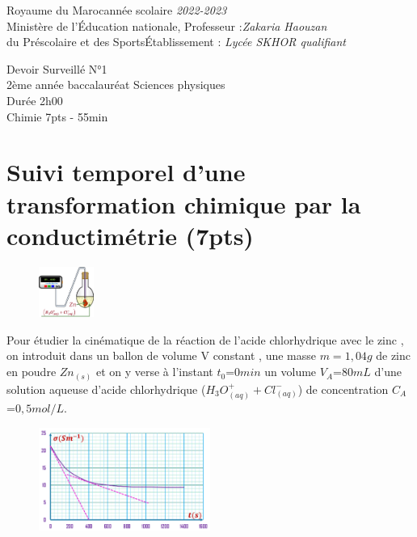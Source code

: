 \documentclass[12pt]{article}
\newcommand\headerMe[2]{\noindent{}#1\hfill#2}
\begin{document}
\headerMe{Royaume du Maroc}{année scolaire \emph{2022-2023}}\\
\headerMe{Ministère de l'Éducation nationale, }{  Professeur :\emph{Zakaria Haouzan}}\\
\headerMe{du Préscolaire et des Sports}{Établissement : \emph{Lycée SKHOR qualifiant}}\\
\vspace{-1cm}
\begin{center}
Devoir Surveillé  N°1 \\
    2ème année baccalauréat Sciences physiques\\
Durée 2h00
\\
    \vspace{.2cm}
\hrulefill
\Large{Chimie 7pts - 55min}
\hrulefill\\

\end{center}

 \section*{Suivi temporel d’une transformation chimique par la conductimétrie \dotfill(7pts) }
\begin{figure}
	\vspace{-1.2cm}
\begin{center}
  \includegraphics[width=0.16\textwidth]{./img/chimie01.png}
\end{center}
\end{figure}


Pour étudier la cinématique de la réaction de l’acide chlorhydrique avec le zinc , on introduit dans un
ballon de volume V constant , une masse $m = 1, 04g$ de zinc en poudre $Zn_{(s)}$ et on y verse à l’instant
$t_0$=$0min$ un volume $V_A$=$80mL$ d’une solution aqueuse d’acide chlorhydrique ($H_3O^+_{(aq)} + Cl^-_{(aq)}$) de concentration $C_A$=$0,5mol/L$.

\begin{figure}
	\vspace{0.5cm}
\begin{center}
  \includegraphics[width=0.5\textwidth]{./img/chimie02.png}
\end{center}
\end{figure}
\end{document}
